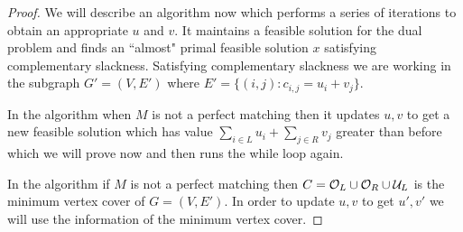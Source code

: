 \documentclass[twoside]{article}
\begin{document}
\begin{proof}
	We will describe an algorithm now which performs a series of iterations to obtain an appropriate $u$ and $v$. It maintains a feasible solution for the dual problem and finds an ``almost" primal feasible solution $x$ satisfying complementary slackness. Satisfying complementary slackness we are working in the subgraph $G'=(V,E')$ where $E'=\{(i,j)\colon c_{i,j}=u_i+v_j\}$.
	\begin{algorithm}\DontPrintSemicolon
	\caption{}
\end{algorithm}
	
	In the algorithm when $M$ is not a perfect matching then it updates $u,v$ to get a new feasible solution which has value $\sum\limits_{i\in L}u_i+\sum\limits_{j\in R}v_j$ greater than before which we will prove now and then runs the while loop again.
	
	In the  algorithm if $M$ is not a perfect matching then $C=\mathcal{O}_L\cup \mathcal{O}_R\cup\mathcal{U}_L$ is the minimum vertex cover of $G=(V,E')$. In order to update $u,v$ to get $u',v'$ we will use the information of the minimum vertex cover. 
	

\end{proof}
\end{document}
